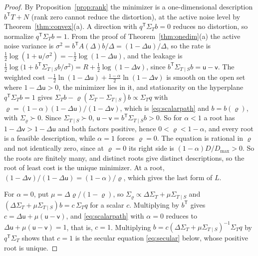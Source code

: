 \documentclass[11pt,onecolumn]{IEEEtran}
\newcommand{\Kc}{\Sigma_{T\mid S}}
\begin{document}
\begin{proof}
By Proposition~\ref{prop:rank} the minimizer is a one-dimensional
description $b^{\mathsf T}T+N$ (rank zero cannot reduce the distortion),
at the active noise level by Theorem~\ref{thm:convex}(a). A direction with
$q^{\mathsf T}\Sigma_Tb=0$ reduces no distortion, so normalize
$q^{\mathsf T}\Sigma_Tb=1$. From the proof of Theorem~\ref{thm:onedim}(a)
the active noise variance is $\sigma^2=b^{\mathsf T}A(\Delta)b/\Delta=(1-\Delta\mathsf u)/\Delta$,
so the rate is $\tfrac12\log(1+\mathsf u/\sigma^2)=-\tfrac12\log(1-\Delta\mathsf u)$,
and the leakage is
$\tfrac12\log\bigl(1+b^{\mathsf T}\Kc b/\sigma^2\bigr)=R+\tfrac12\log(1-\Delta\mathsf v)$,
since $b^{\mathsf T}\Kc b=\mathsf u-\mathsf v$. The weighted cost
$-\tfrac12\ln(1-\Delta\mathsf u)+\tfrac{1-\alpha}2\ln(1-\Delta\mathsf v)$ is smooth
on the open set where $1-\Delta\mathsf u>0$, the minimizer lies in it, and
stationarity on the hyperplane $q^{\mathsf T}\Sigma_Tb=1$ gives
$\Sigma_Tb-\varrho(\Sigma_T-\Kc)b\propto\Sigma_Tq$ with
$\varrho=(1-\alpha)(1-\Delta\mathsf u)/(1-\Delta\mathsf v)$, which is
\eqref{eq:scalarpath} and $b=b(\varrho)$, with $\Sigma_\varrho\succ0$. Since
$\Kc\succ0$, $\mathsf u-\mathsf v=b^{\mathsf T}\Kc b>0$. So for $\alpha<1$ a
root has $1-\Delta\mathsf v>1-\Delta\mathsf u$ and both factors positive,
hence $0<\varrho<1-\alpha$, and every root is a feasible description,
while $\alpha=1$ forces $\varrho=0$. The equation is rational in $\varrho$
and not identically zero, since at $\varrho=0$ its right side is
$(1-\alpha)D/D_{\max}>0$. So the roots are finitely many, and distinct
roots give distinct descriptions, so the root of least cost is the
unique minimizer. At a root, $(1-\Delta\mathsf v)/(1-\Delta\mathsf u)=(1-\alpha)/\varrho$,
which gives the last form of $L$.

For $\alpha=0$, put $\mu=\Delta\varrho/(1-\varrho)$, so
$\Sigma_\varrho\propto\Delta\Sigma_T+\mu\Kc$ and
$(\Delta\Sigma_T+\mu\Kc)b=c\,\Sigma_Tq$ for a scalar $c$. Multiplying by
$b^{\mathsf T}$ gives $c=\Delta\mathsf u+\mu(\mathsf u-\mathsf v)$, and
\eqref{eq:scalarpath} with $\alpha=0$ reduces to
$\Delta\mathsf u+\mu(\mathsf u-\mathsf v)=1$, that is, $c=1$. Multiplying
$b=c(\Delta\Sigma_T+\mu\Kc)^{-1}\Sigma_Tq$ by $q^{\mathsf T}\Sigma_T$ shows
that $c=1$ is the secular equation \eqref{eq:secular} below, whose
positive root is unique.
\end{proof}
\end{document}
